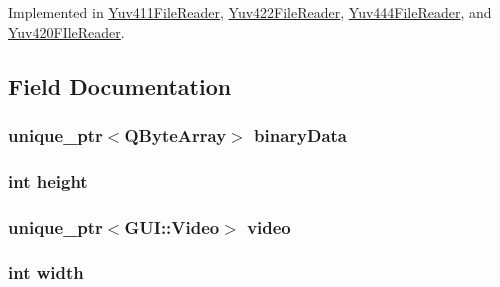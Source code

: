 Implemented in \hyperlink{classUtility_1_1Yuv411FileReader_ac6e45d1a396bdb81c8c8174bf5cc41c6}{Yuv411\+File\+Reader}, \hyperlink{classUtility_1_1Yuv422FileReader_ac6e45d1a396bdb81c8c8174bf5cc41c6}{Yuv422\+File\+Reader}, \hyperlink{classUtility_1_1Yuv444FileReader_ac6e45d1a396bdb81c8c8174bf5cc41c6}{Yuv444\+File\+Reader}, and \hyperlink{classUtility_1_1Yuv420FIleReader_ac6e45d1a396bdb81c8c8174bf5cc41c6}{Yuv420\+F\+Ile\+Reader}.



\subsection{Field Documentation}
\hypertarget{classUtility_1_1YuvFileReader_aa6f0d985e2603aa538ffa615b26c0b4d}{}
\subsubsection[{binary\+Data}]{\setlength{\rightskip}{0pt plus 5cm}unique\+\_\+ptr$<$Q\+Byte\+Array$>$ binary\+Data\hspace{0.3cm}{\ttfamily [protected]}}\label{classUtility_1_1YuvFileReader_aa6f0d985e2603aa538ffa615b26c0b4d}
\hypertarget{classUtility_1_1YuvFileReader_ad12fc34ce789bce6c8a05d8a17138534}{}
\subsubsection[{height}]{\setlength{\rightskip}{0pt plus 5cm}int height\hspace{0.3cm}{\ttfamily [protected]}}\label{classUtility_1_1YuvFileReader_ad12fc34ce789bce6c8a05d8a17138534}
\hypertarget{classUtility_1_1YuvFileReader_aedb9abd93d48b062011f2d51495063ec}{}
\subsubsection[{video}]{\setlength{\rightskip}{0pt plus 5cm}unique\+\_\+ptr$<${\bf G\+U\+I\+::\+Video}$>$ video\hspace{0.3cm}{\ttfamily [protected]}}\label{classUtility_1_1YuvFileReader_aedb9abd93d48b062011f2d51495063ec}
\hypertarget{classUtility_1_1YuvFileReader_a2474a5474cbff19523a51eb1de01cda4}{}
\subsubsection[{width}]{\setlength{\rightskip}{0pt plus 5cm}int width\hspace{0.3cm}{\ttfamily [protected]}}\label{classUtility_1_1YuvFileReader_a2474a5474cbff19523a51eb1de01cda4}
